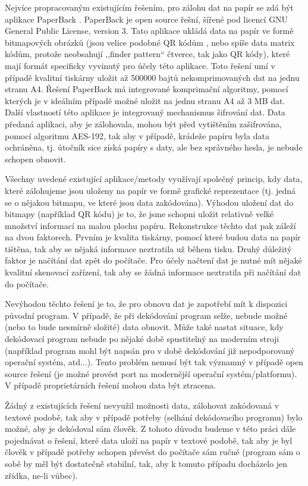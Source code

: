 \documentclass[conference]{IEEEtran}
\begin{document}
Nejvíce propracovaným existujícím řešením, pro zálohu dat na papír se zdá být aplikace PaperBack \cite{PaperBak}. PaperBack je open source řešní, šířené pod licencí GNU General Public License, version 3. Tato aplikace ukládá data na papír ve formě bitmapových obrázků (jsou velice podobné QR kódům \cite{ScanningQrCodes}, nebo spíše data matrix kódům, protože neobsahují ,,finder pattern`` čtverce, tak jako QR kódy), které mají formát specificky vyvinutý pro účely této aplikace. Toto řešení umí v případě kvalitní tiskárny uložit až 500000 bajtů nekomprimovaných dat na jednu stranu A4. Řešení PaperBack má integrované komprimační algoritmy, pomocí kterých je v ideálním případě možné uložit na jednu stranu A4 až 3 MB dat. Další vlastností této aplikace je integrovaný mechanismus šifrování dat. Data předaná aplikaci, aby je zálohovala, mohou být před vytištěním zašifrována, pomocí algoritmu AES-192, tak aby v případě, krádeže papíru byla data ochráněna, tj. útočník sice získá papíry s daty, ale bez správného hesla, je nebude schopen obnovit.

Všechny uvedené existující aplikace/metody využívají společný princip, kdy data, které zálohujeme jsou uloženy na papír ve formě grafické reprezentace (tj. jedná se o nějakou bitmapu, ve které jsou data zakódována). Výhodou uložení dat do bitmapy (například QR kódu) je to, že jsme schopni uložit relativně velké množství informací na malou plochu papíru. Rekonstrukce těchto dat pak záleží na dvou faktorech. Prvním je kvalita tiskárny, pomocí které budou data na papír tištěna, tak aby se nějaká informace neztratila už během tisku. Druhý důležitý faktor je načítání dat zpět do počítače. Pro účely načtení dat je nutné mít nějaké kvalitní skenovací zařízení, tak aby se žádná informace neztratila při načítání dat do počítače. 

Nevýhodou těchto řešení je to, že pro obnovu dat je zapotřebí mít k dispozici původní program. V případě, že při dekódování program selže, nebude možné (nebo to bude nesmírně složité) data obnovit. Může také nastat situace, kdy dekódovací program nebude po nějaké době spustitelný na moderním stroji (například program mohl být napsán pro v době dekódování již nepodporovaný operační systém, atd...). Tento problém nemusí být tak významný v případě open source řešení (je možné provést port na modernější operační systém/platformu). V případě proprietárních řešení mohou data být ztracena.

Žádný z existujících řešení nevyužil možnosti data, zálohovat zakódovaná v textové podobě, tak aby v případě potřeby (selhání dekódovacího programu) bylo možné, aby je dekódoval sám člověk. Z tohoto důvodu budeme v této práci dále pojednávat o řešení, které data uloží na papír v textové podobě, tak aby je byl člověk v případě potřeby schopen převést do počítače sám ručně (program sám o sobě by měl být dostatečně stabilní, tak, aby k tomuto případu docházelo jen zřídka, ne-li vůbec). 
\end{document}
